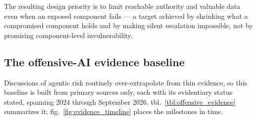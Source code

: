 \documentclass[
  english,
  9pt,
]{extarticle}
\begin{document}
The resulting design priority is to limit reachable authority and
valuable data even when an exposed component fails --- a target achieved
by shrinking what a compromised component holds and by making silent
escalation impossible, not by promising component-level invulnerability.

\subsection{The offensive-AI evidence
baseline}\label{the-offensive-ai-evidence-baseline}

Discussions of agentic risk routinely over-extrapolate from thin
evidence, so this baseline is built from primary sources only, each with
its evidentiary status stated, spanning 2024 through September 2026.
tbl.~\ref{tbl:offensive_evidence} summarizes it;
fig.~\ref{fig:evidence_timeline} places the milestones in time.
\end{document}
